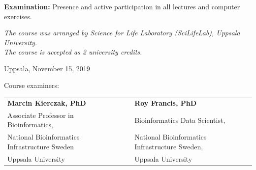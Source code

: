 \documentclass[a4paper]{letter}
\begin{document}
{{\bf Examination:} Presence and active participation in all lectures and computer exercises.  

\textit{The course was arranged by Science for Life Laboratory (SciLifeLab), Uppsala University. \\
The course is accepted as 2 university credits.}  

\vspace{10mm}

Uppsala, November 15, 2019
\vspace{5mm}

Course examiners:\\

\vspace{10mm}
\begin{tabular}{ lll } 
{\bf Marcin Kierczak, PhD} & \hspace{1.2cm} & {\bf Roy Francis, PhD} \\  
Associate Professor in Bioinformatics, & & Bioinformatics Data Scientist,\\  
National Bioinformatics Infrastructure Sweden & & National Bioinformatics Infrastructure Sweden,\\
Uppsala University & & Uppsala University
\end{tabular}
}
\end{document}
